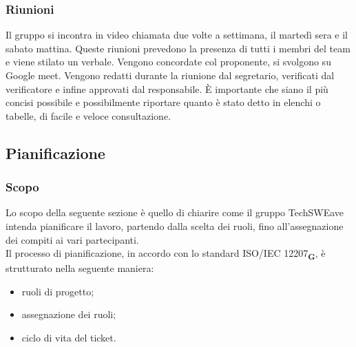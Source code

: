 \subsubsection{Riunioni}
Il gruppo si incontra in video chiamata due volte a settimana, il martedì sera e il sabato mattina. Queste riunioni prevedono la presenza di tutti i membri del team e viene stilato un verbale.
Vengono concordate col proponente, si svolgono su Google meet.
Vengono redatti durante la riunione dal segretario, verificati dal verificatore e infine approvati dal responsabile. \`E importante che siano il più concisi possibile e possibilmente riportare quanto è stato detto in elenchi o tabelle, di facile e veloce consultazione.
\subsection{Pianificazione}
\subsubsection{Scopo}
Lo scopo della seguente sezione è quello di chiarire come il gruppo TechSWEave intenda pianificare il lavoro, partendo dalla scelta dei ruoli, fino all'assegnazione dei compiti ai vari partecipanti.\\
Il processo di pianificazione, in accordo con lo standard ISO/IEC 12207\textsubscript{\textbf{G}}, è strutturato nella seguente maniera:
\begin {itemize}
    \item ruoli di progetto;
    \item assegnazione dei ruoli;
    \item ciclo di vita del ticket.
\end {itemize}
